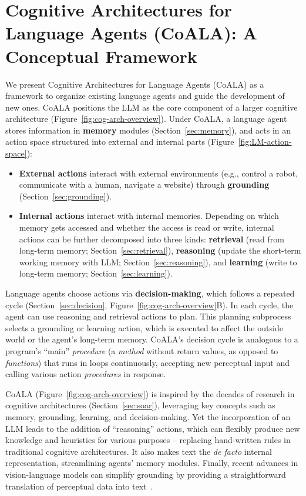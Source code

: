 \documentclass[10pt]{article} %
\begin{document}
\section{Cognitive Architectures for Language Agents (CoALA): A Conceptual Framework}
\label{sec:coala}

We present Cognitive Architectures for Language Agents (CoALA) as a framework to organize existing language agents and guide the development of new ones. 
CoALA positions the LLM as the core component of a larger cognitive architecture (Figure~\ref{fig:cog-arch-overview}). Under CoALA, a language agent stores information in \textbf{memory} modules (Section~\ref{sec:memory}), and acts in an action space structured into external and internal parts (Figure~\ref{fig:LM-action-space}):
\begin{itemize}
  \item \textbf{External actions} interact with external environments (e.g., control a robot, communicate with a human, navigate a website) through \textbf{grounding} (Section~\ref{sec:grounding}).
  \item \textbf{Internal actions} interact with internal memories. Depending on which memory gets accessed and whether the access is read or write, internal actions can be further decomposed into three kinds:  \textbf{retrieval} (read from long-term memory; Section~\ref{sec:retrieval}), \textbf{reasoning} (update the short-term working memory with LLM; Section~\ref{sec:reasoning}), and \textbf{learning} (write to long-term memory; Section~\ref{sec:learning}).
\end{itemize} 
Language agents choose actions via \textbf{decision-making}, which follows a repeated cycle (Section~\ref{sec:decision}, Figure~\ref{fig:cog-arch-overview}B). In each cycle, the agent can use reasoning and retrieval actions to plan. This planning subprocess selects a grounding or learning action, which is executed to affect the outside world or the agent's long-term memory. CoALA's decision cycle is analogous to a program's ``main'' \emph{procedure} (a \emph{method} without return values, as opposed to \emph{functions}) that runs in loops continuously, accepting new perceptual input and calling various action \emph{procedures} in response.

CoALA (Figure~\ref{fig:cog-arch-overview}) is inspired by the decades of research in cognitive architectures (Section~\ref{sec:soar}), leveraging key concepts such as memory, grounding, learning, and decision-making. Yet the incorporation of an LLM leads to the addition of ``reasoning'' actions, which can flexibly produce new knowledge and heuristics for various purposes -- replacing hand-written rules in traditional cognitive architectures. 
It also makes text the \emph{de facto} internal representation, streamlining agents' memory modules. Finally, recent advances in vision-language models \cite[VLMs;][]{alayrac2022flamingo} can simplify grounding by providing a straightforward translation of perceptual data into text~\citep{zeng2022socratic}. 
\end{document}
